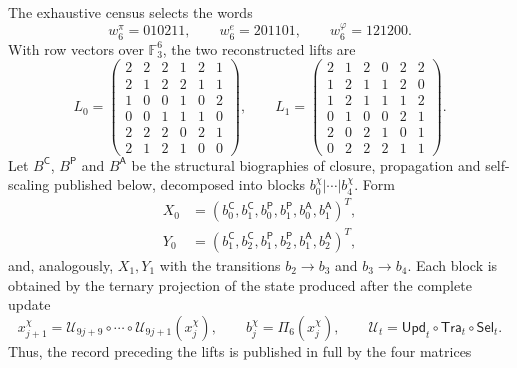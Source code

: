 The exhaustive census selects the words
\[
 w_6^\pi=010211,\qquad
 w_6^e=201101,\qquad
 w_6^\varphi=121200.
\]
With row vectors over \(\mathbb F_3^6\), the two reconstructed lifts
are
\[
L_0=
\begin{pmatrix}
2&2&2&1&2&1\\
2&1&2&2&1&1\\
1&0&0&1&0&2\\
0&0&1&1&1&0\\
2&2&2&0&2&1\\
2&1&2&1&0&0
\end{pmatrix},
\qquad
L_1=
\begin{pmatrix}
2&1&2&0&2&2\\
1&2&1&1&2&0\\
1&2&1&1&1&2\\
0&1&0&0&2&1\\
2&0&2&1&0&1\\
0&2&2&2&1&1
\end{pmatrix}.
\]
Let \(B^{\mathsf C}\), \(B^{\mathsf P}\) and \(B^{\mathsf A}\) be the
structural biographies of closure, propagation and self-scaling
published below, decomposed into blocks
\(b_0^\chi|\cdots|b_4^\chi\). Form
\[
 \begin{aligned}
 X_0&=(b_0^{\mathsf C},b_1^{\mathsf C},
       b_0^{\mathsf P},b_1^{\mathsf P},
       b_0^{\mathsf A},b_1^{\mathsf A})^T,\\
 Y_0&=(b_1^{\mathsf C},b_2^{\mathsf C},
       b_1^{\mathsf P},b_2^{\mathsf P},
       b_1^{\mathsf A},b_2^{\mathsf A})^T,
 \end{aligned}
\]
and, analogously, \(X_1,Y_1\) with the transitions
\(b_2\to b_3\) and \(b_3\to b_4\). Each block is obtained by the ternary
projection of the state produced after the complete update
\[
 x_{j+1}^{\chi}
 =\mathcal U_{9j+9}\circ\cdots\circ\mathcal U_{9j+1}(x_j^{\chi}),
 \qquad
 b_j^{\chi}=\Pi_6(x_j^{\chi}),
 \qquad
 \mathcal U_t=\mathsf{Upd}_t\circ\mathsf{Tra}_t\circ\mathsf{Sel}_t.
\]
Thus, the record preceding the lifts is published
in full by the four matrices
\begingroup\scriptsize
